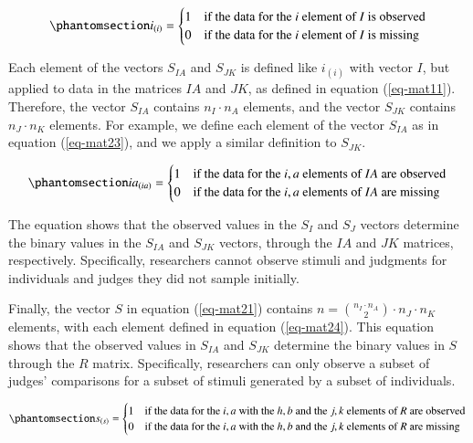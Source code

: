 \documentclass[
  authoryear,
  review,
  1p]{elsarticle}
\begin{document}
\begin{equation}\phantomsection\label{eq-mat22}{
i_{(i)} = \begin{cases} 
1 & \text{if the data for the } i \text{ element of } I \text{ is observed} \\
0 & \text{if the data for the } i \text{ element of } I \text{ is missing}
\end{cases}
}\end{equation}

Each element of the vectors \(S_{IA}\) and \(S_{JK}\) is defined like
\(i_{(i)}\) with vector \(I\), but applied to data in the matrices
\(IA\) and \(JK\), as defined in equation (\ref{eq-mat11}). Therefore,
the vector \(S_{IA}\) contains \(n_{I} \cdot n_{A}\) elements, and the
vector \(S_{JK}\) contains \(n_{J} \cdot n_{K}\) elements. For example,
we define each element of the vector \(S_{IA}\) as in equation
(\ref{eq-mat23}), and we apply a similar definition to \(S_{JK}\).

\begin{equation}\phantomsection\label{eq-mat23}{
ia_{(ia)} = \begin{cases} 
1 & \text{if the data for the } i,a \text{ elements of } IA \text{ are observed} \\
0 & \text{if the data for the } i,a \text{ elements of } IA \text{ are missing}
\end{cases}
}\end{equation}

The equation shows that the observed values in the \(S_{I}\) and
\(S_{J}\) vectors determine the binary values in the \(S_{IA}\) and
\(S_{JK}\) vectors, through the \(IA\) and \(JK\) matrices,
respectively. Specifically, researchers cannot observe stimuli and
judgments for individuals and judges they did not sample initially.

Finally, the vector \(S\) in equation (\ref{eq-mat21}) contains
\(n = \binom{n_{I} \cdot n_{A}}{2} \cdot n_{J} \cdot n_{K}\) elements,
with each element defined in equation (\ref{eq-mat24}). This equation
shows that the observed values in \(S_{IA}\) and \(S_{JK}\) determine
the binary values in \(S\) through the \(R\) matrix. Specifically,
researchers can only observe a subset of judges' comparisons for a
subset of stimuli generated by a subset of individuals.

\begin{equation}\phantomsection\label{eq-mat24}{
s_{(s)} = \begin{cases} 
1 & \text{if the data for the } i,a \text{ with the } h,b \text{ and the } j,k \text{ elements of } R \text{ are observed} \\
0 & \text{if the data for the } i,a \text{ with the } h,b \text{ and the } j,k \text{ elements of } R \text{ are missing}
\end{cases}
}\end{equation}
\end{document}
